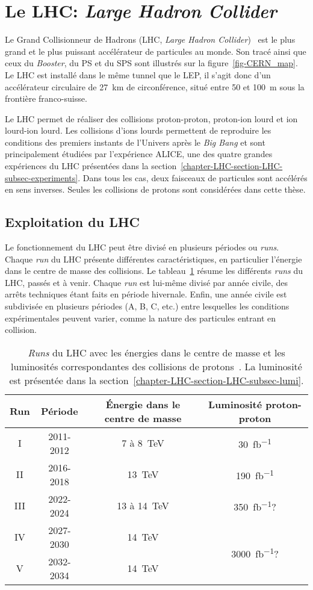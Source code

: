 \section{Le LHC: \emph{Large Hadron Collider}}\label{chapter-LHC-section-LHC}
Le Grand Collisionneur de Hadrons (LHC, \emph{Large Hadron Collider})~\cite{LHC_paper1,LHC_paper2,LHC_paper3} est le plus grand et le plus puissant accélérateur de particules au monde.
Son tracé ainsi que ceux du \emph{Booster}, du PS et du SPS sont illustrés sur la figure~\ref{fig-CERN_map}.
Le LHC est installé dans le même tunnel que le LEP, il s'agit donc d'un accélérateur circulaire de \SI{27}{\kilo\meter} de circonférence, situé entre \num{50} et \SI{100}{\meter} sous la frontière franco-suisse.
\par Le LHC permet de réaliser des collisions proton-proton, proton-ion lourd et ion lourd-ion lourd.
Les collisions d'ions lourds permettent de reproduire les conditions des premiers instants de l'Univers après le \emph{Big Bang} et sont principalement étudiées par l'expérience ALICE, une des quatre grandes expériences du LHC présentées dans la section~\ref{chapter-LHC-section-LHC-subsec-experiments}.
Dans tous les cas, deux faisceaux de particules sont accélérés en sens inverses.
Seules les collisions de protons sont considérées dans cette thèse.
\subsection{Exploitation du LHC}\label{chapter-LHC-section-LHC-subsec-LHC_runs}
Le fonctionnement du LHC peut être divisé en plusieurs périodes ou \emph{runs}.
Chaque \emph{run} du LHC présente différentes caractéristiques, en particulier l'énergie dans le centre de masse des collisions.
Le tableau~\ref{tab-LHC_runs} résume les différents \emph{runs} du LHC, passés et à venir.
Chaque \emph{run} est lui-même divisé par année civile, des arrêts techniques étant faits en période hivernale.
Enfin, une année civile est subdivisée en plusieurs périodes (A, B, C, etc.) entre lesquelles les conditions expérimentales peuvent varier, comme la nature des particules entrant en collision.
\begin{table}[h]
\centering
\begin{tabular}{cccc}
\toprule
Run & Période & Énergie dans le centre de masse & Luminosité proton-proton\\
\midrule
I & 2011-2012 & 7 à \SI{8}{\TeV} & \SI{30}{\femto\barn^{-1}} \\
II & 2016-2018 & \SI{13}{\TeV} & \SI{190}{\femto\barn^{-1}} \\
III & 2022-2024 & 13 à \SI{14}{\TeV} & \SI{350}{\femto\barn^{-1}}? \\
IV & 2027-2030 & \SI{14}{\TeV} & \multirow{2}{*}{\SI{3000}{\femto\barn^{-1}}?}\\
V & 2032-2034 & \SI{14}{\TeV} & \\
\bottomrule
\end{tabular}
\caption[\emph{Runs} du LHC.]{\emph{Runs} du LHC avec les énergies dans le centre de masse et les luminosités correspondantes des collisions de protons~\cite{LHC_commissioning}. La luminosité est présentée dans la section~\ref{chapter-LHC-section-LHC-subsec-lumi}.}
\label{tab-LHC_runs}
\end{table}
